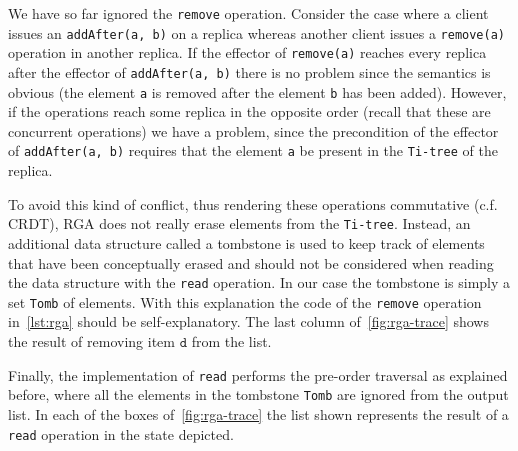 
We have so far ignored the \lstinline|remove| operation.
%
Consider the case where a client issues an \lstinline|addAfter(a, b)|
on a replica whereas another client issues a \lstinline|remove(a)|
operation in another replica.
%
If the effector of \lstinline|remove(a)| reaches every replica after
the effector of \lstinline|addAfter(a, b)| there is no problem since
the semantics is obvious (the element \lstinline|a| is removed after
the element \lstinline|b| has been added).
%
However, if the operations reach some replica in the opposite order
(recall that these are concurrent operations) we have a problem, since
the precondition of the effector of \lstinline|addAfter(a, b)|
requires that the element \lstinline|a| be present in the
\lstinline|Ti-tree| of the replica.

To avoid this kind of conflict, thus rendering these operations
commutative (c.f. CRDT), RGA does not really erase elements from the
\lstinline|Ti-tree|.
%
Instead, an additional data structure called a tombstone is used to
keep track of elements that have been conceptually erased and should
not be considered when reading the data structure with the
\lstinline|read| operation.
%
In our case the tombstone is simply a set \lstinline|Tomb| of
elements.
%
With this explanation the code of the \lstinline|remove| operation
in~\autoref{lst:rga} should be self-explanatory.
%
The last column of~\autoref{fig:rga-trace} shows the result of
removing item $\mathtt{d}$ from the list. 

Finally, the implementation of \lstinline|read| performs the pre-order
traversal as explained before, where all the elements in the tombstone
\lstinline|Tomb| are ignored from the output list.
%
In each of the boxes of~\autoref{fig:rga-trace} the list shown
represents the result of a \lstinline|read| operation in the state
depicted. 


